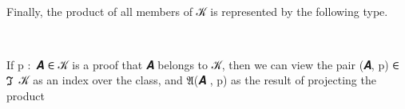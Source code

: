 \documentclass[a4paper,UKenglish,cleveref,autoref,thm-restate]{lipics-v2021}
\begin{document}
\begin{code}
\>[1]\AgdaSpace{}%
\AgdaSymbol{:}\AgdaSpace{}%
\AgdaSymbol{\{}\AgdaSpace{}%
\AgdaSymbol{:}\AgdaSpace{}%
\AgdaSymbol{\}\{}\AgdaSpace{}%
\AgdaSymbol{:}\AgdaSpace{}%
\AgdaSpace{}%
\AgdaSymbol{(}\AgdaSpace{}%
\AgdaSpace{}%
\AgdaSymbol{)(}\AgdaSpace{}%
\AgdaSymbol{)\}}\AgdaSpace{}%
\AgdaSpace{}%
\AgdaSpace{}%
\AgdaSpace{}%
\AgdaSpace{}%
\AgdaSpace{}%
\AgdaSpace{}%
\<%
\\
%
\>[1]\AgdaSymbol{\{}\AgdaSymbol{\}\{}\AgdaSymbol{\}}\AgdaSpace{}%
\AgdaSymbol{=}\AgdaSpace{}%
\AgdaSpace{}%
\AgdaSymbol{(}\AgdaSpace{}%
\AgdaSymbol{:}\AgdaSpace{}%
\AgdaSymbol{(}\AgdaSpace{}%
\AgdaSymbol{))}\AgdaSpace{}%
\AgdaSpace{}%
\AgdaSpace{}%
\AgdaSpace{}%
\<%
\end{code}
\ccpad
Finally, the product of all members of 𝒦 is represented by the following type.
\ccpad
\begin{code}
\>[1]\AgdaSpace{}%
\AgdaSymbol{:}\AgdaSpace{}%
\AgdaSymbol{\{}\AgdaSpace{}%
\AgdaSymbol{:}\AgdaSpace{}%
\AgdaSymbol{\}}\AgdaSpace{}%
\AgdaSpace{}%
\AgdaSpace{}%
\AgdaSymbol{(}\AgdaSpace{}%
\AgdaSpace{}%
\AgdaSymbol{)(}\AgdaSpace{}%
\AgdaSymbol{)}\AgdaSpace{}%
\AgdaSpace{}%
\AgdaSpace{}%
\AgdaSymbol{(}\AgdaSpace{}%
\AgdaSymbol{)}\AgdaSpace{}%
\<%
\\
%
\>[1]\AgdaSpace{}%
\AgdaSymbol{\{}\AgdaSymbol{\}}\AgdaSpace{}%
\AgdaSpace{}%
\AgdaSymbol{=}\AgdaSpace{}%
\AgdaSpace{}%
\AgdaSymbol{(}\AgdaSpace{}%
\AgdaSymbol{\{}\AgdaSymbol{\}\{}\AgdaSymbol{\}}\AgdaSpace{}%
\AgdaSymbol{)}\<%
\end{code}
\ccpad
If \ab p \as :~\ab 𝑨 \as ∈ \ab 𝒦 is a proof that \ab 𝑨 belongs to \ab 𝒦, then we can view the pair (\ab 𝑨, \ab p) \as ∈ \af ℑ\ \ab 𝒦 as an index over the class, and \af 𝔄(\ab 𝑨 , \ab p) as the result of projecting the product %
\end{document}
